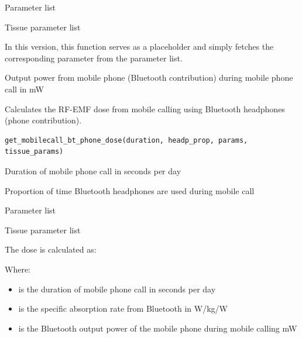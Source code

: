\documentclass[a4paper]{book}
\begin{document}
%
\begin{Arguments}
\begin{ldescription}
\item[\code{params}] Parameter list

\item[\code{tissue\_params}] Tissue parameter list
\end{ldescription}
\end{Arguments}
%
\begin{Details}
In this version, this function serves as a placeholder and simply fetches the corresponding parameter from the parameter list.
\end{Details}
%
\begin{Value}
Output power from mobile phone (Bluetooth contribution) during mobile phone call in mW
\end{Value}
%
\begin{Description}
Calculates the RF-EMF dose from mobile calling using Bluetooth headphones (phone contribution).
\end{Description}
%
\begin{Usage}
\begin{verbatim}
get_mobilecall_bt_phone_dose(duration, headp_prop, params, tissue_params)
\end{verbatim}
\end{Usage}
%
\begin{Arguments}
\begin{ldescription}
\item[\code{duration}] Duration of mobile phone call in seconds per day

\item[\code{headp\_prop}] Proportion of time Bluetooth headphones are used during mobile call

\item[\code{params}] Parameter list

\item[\code{tissue\_params}] Tissue parameter list
\end{ldescription}
\end{Arguments}
%
\begin{Details}
The dose is calculated as:

Where:
\begin{itemize}

\item{}  is the duration of mobile phone call in seconds per day
\item{}  is the specific absorption rate from Bluetooth in W/kg/W
\item{}  is the Bluetooth output power of the mobile phone during mobile calling mW

\end{itemize}

\end{Details}
\end{document}
